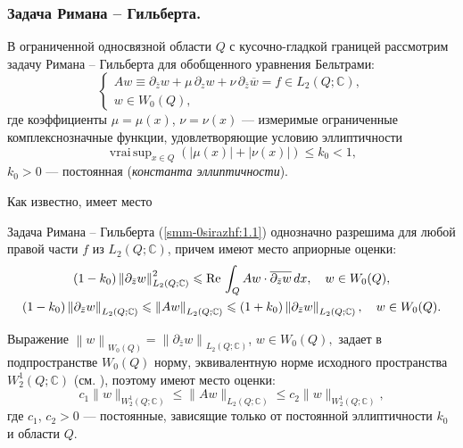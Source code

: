 \subsubsection{Задача Римана -- Гильберта.} В ограниченной односвязной области $Q$ с кусочно-гладкой границей рассмотрим задачу Римана -- Гильберта для обобщенного уравнения Бельтрами:
\begin{equation}\label{smm-0sirazhf:1.1}
	\left\{\begin{array}{l}
		A w\equiv\partial_{\bar{z}}w+\mu\,\partial_z w+\nu\,\partial_{\bar z}\overline{w}=f\in L_2(Q;\mathbb{C}), \\[3mm]
		w\in W_0(Q),
	\end{array}\right.
\end{equation}
где коэффициенты $\mu=\mu(x)$, $\nu=\nu(x)$ --- измеримые ограниченные комплекснозначные функции, удовлетворяющие условию эллиптичности
\begin{equation}\label{smm-00sirazhf:1.2}
	\mathop{vrai\,sup}_{x\in Q}\left(|\mu(x)|+|\nu(x)|\right)\leqslant k_0 <1,
\end{equation}
$k_0>0$ --- постоянная (\textit{константа эллиптичности}).

Как известно, имеет место

\begin{theorem}\label{smm2-th1}
 Задача Римана -- Гильберта {(\ref{smm-0sirazhf:1.1})} однозначно разрешима для любой правой части $f$ из $L_2(Q;\mathbb{C})$,
	причем имеют место априорные оценки:
\begin{gather}\label{smm-0sirazhf:1.3}
	(1-k_0)\left\|\partial_{\bar{z}}w\right\|^2_{L_2(Q;\mathbb{C})}\leqslant \text{Re\,} \int_{Q} Aw\cdot \overline{\partial_{\bar{z}}w}\,dx,\quad w\in W_0(Q),\\
	\label{smm-0sirazhf:1.4}
	(1-k_0)\left\|\partial_{\bar{z}}w\right\|_{L_2(Q;\mathbb{C})}\leqslant \left\| Aw\right\|_{L_2(Q;\mathbb{C})} \leqslant
	(1+k_0)\left\|\partial_{\bar{z}}w\right\|_{L_2(Q;\mathbb{C})}, \quad w\in W_0(Q).
\end{gather}
\end{theorem}
Выражение
$
\left\| w\right\|_{W_0(Q)}=\left\| \partial_{\bar{z}}w\right\|_{L_2(Q;\mathbb{C})}$, $w\in W_0(Q),
$
задает в подпространстве $W_0(Q)$ норму, эквивалентную норме исходного пространства $W_2^1(Q;\mathbb{C})$ (см.  \cite{smm-12,smm-13}),
поэтому имеют место оценки:
\begin{equation}\label{smm-0sirazhf:1.5}
	c_1\|w\|_{W^1_2(Q;\mathbb{C})}\leqslant\|Aw\|_{L_2(Q;\mathbb{C})}\leqslant c_2 \|w\|_{W^1_2(Q;\mathbb{C})},
\end{equation}
где $c_1$, $c_2>0$ --- постоянные, зависящие только от постоянной эллиптичности $k_0$ и области $Q$.

